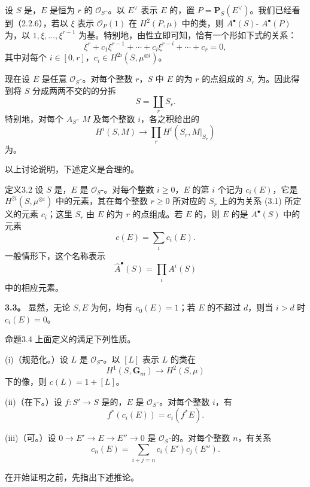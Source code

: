 设 $S$ 是，$E$ 是恒为 $r$ 的 $\mathscr O_S$-。以 $E^\vee$ 表示 $E$ 的，置 $P=\mathbf P_S(E^\vee)$。我们已经看到（2.2.6），若以 $\xi$ 表示 $\mathscr O_P(1)$ 在 $H^2(P,\mu)$ 中的类，则 $A^\bullet(S)$- $A^\bullet(P)$ 为，以 $1,\xi,\ldots,\xi^{r-1}$ 为基。特别地，由性立即可知，恰有一个形如下式的关系：
\[
 \xi^r+c_1\xi^{r-1}+\cdots+c_i\xi^{r-i}+\cdots+c_r=0,\tag{3.1}
\]
其中对每个 $i\in[0,r]$，$c_i\in H^{2i}(S,\mu^{\otimes i})$。

现在设 $E$ 是任意 $\mathscr O_S$-。对每个整数 $r$，$S$ 中 $E$ 的为 $r$ 的点组成的 $S_r$ 为。因此得到将 $S$ 分成两两不交的的分拆
\[
 S=\coprod_r S_r.
\]
特别地，对每个 $A_S$- $M$ 及每个整数 $i$，各之积给出的
\[
 H^i(S,M)\longrightarrow\prod_rH^i(S_r,M|_{S_r})
\]
为。

以上讨论说明，下述定义是合理的。

\begin{SGAresult}{定义}{3.2}
设 $S$ 是，$E$ 是 $\mathscr O_S$-。对每个整数 $i\ge0$，$E$ 的第 $i$ 个记为 $c_i(E)$，它是 $H^{2i}(S,\mu^{\otimes i})$ 中的元素，其在每个整数 $r\ge0$ 所对应的 $S_r$ 上的为关系 (3.1) 所定义的元素 $c_i$；这里 $S_r$ 由 $E$ 的为 $r$ 的点组成。若 $E$ 的，则 $E$ 的是 $A^\bullet(S)$ 中的元素
\[
 c(E)=\sum_i c_i(E).
\]
一般情形下，这个名称表示
\[
 \widehat A^\bullet(S)=\prod_iA^i(S)
\]
中的相应元素。
\end{SGAresult}

\textbf{3.3。} 显然，无论 $S,E$ 为何，均有 $c_0(E)=1$；若 $E$ 的不超过 $d$，则当 $i>d$ 时 $c_i(E)=0$。

\begin{SGAresult}{命题}{3.4}
上面定义的满足下列性质。

(i)（规范化。）设 $L$ 是 $\mathscr O_S$-。以 $[L]$ 表示 $L$ 的类在
\[
 H^1(S,\mathbf G_m)\longrightarrow H^2(S,\mu)
\]
下的像，则 $c(L)=1+[L]$。

(ii)（在下。）设 $f:S'\to S$ 是的，$E$ 是 $\mathscr O_S$-。对每个整数 $i$，有
\[
 f^*(c_i(E))=c_i(f^*E).
\]

(iii)（可。）设 $0\to E'\to E\to E''\to0$ 是 $\mathscr O_S$-的。对每个整数 $n$，有关系
\[
 c_n(E)=\sum_{i+j=n}c_i(E')c_j(E'').
\]
\end{SGAresult}
在开始证明之前，先指出下述推论。

